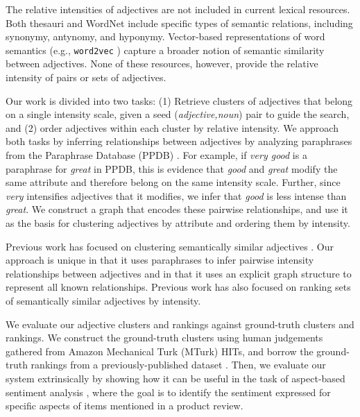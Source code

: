 \documentclass[11pt,a4paper]{article}
\begin{document}

The relative intensities of adjectives are not included in current lexical resources. Both thesauri and WordNet \cite{Miller:1995:WLD:219717.219748} include specific types of semantic relations, including synonymy, antynomy, and hyponymy. Vector-based representations of word semantics (e.g., \texttt{word2vec} \cite{word2vec}) capture a broader notion of semantic similarity between adjectives. None of these resources, however, provide the relative intensity of pairs or sets of adjectives. 

Our work is divided into two tasks: (1) Retrieve clusters of adjectives that belong on a single intensity scale, given a seed (\textit{adjective,noun}) pair to guide the search, and (2) order adjectives within each cluster by relative intensity. We approach both tasks by inferring relationships between adjectives by analyzing paraphrases from the Paraphrase Database (PPDB) \cite{pavlick-EtAl:2015:ACL-IJCNLP3}. For example, if \textit{very good} is a paraphrase for \textit{great} in PPDB, this is evidence that \textit{good} and \textit{great} modify the same attribute and therefore belong on the same intensity scale. Further, since \textit{very} intensifies adjectives that it modifies, we infer that \textit{good} is less intense than \textit{great}. We construct a graph that encodes these pairwise relationships, and use it as the basis for clustering adjectives by attribute and ordering them by intensity.

Previous work has focused on clustering semantically similar adjectives \cite{hatzivassiloglou:93,shivade:15}. Our approach is unique in that it uses paraphrases to infer pairwise intensity relationships between adjectives and in that it uses an explicit graph structure to represent all known relationships. Previous work \cite{demarneffe:10,demelo:13,shivade:15} has also focused on ranking sets of semantically similar adjectives by intensity.

We evaluate our adjective clusters and rankings against ground-truth clusters and rankings. We construct the ground-truth clusters using human judgements gathered from Amazon Mechanical Turk (MTurk) HITs, and borrow the ground-truth rankings from a previously-published dataset \cite{demelo:13}. Then, we evaluate our system extrinsically by showing how it can be useful in the task of aspect-based sentiment analysis \cite{pontiki2014semeval,pontiki2016semeval}, where the goal is to identify the sentiment expressed for specific aspects of items mentioned in a product review.
\end{document}
